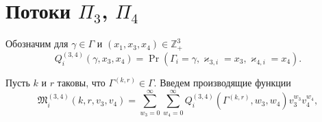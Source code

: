 \documentclass[a4paper,12pt,russian]{extarticle}
\begin{document}
\section{Потоки $\Pi_3$, $\Pi_4$}



Обозначим для $\gamma \in \Gamma$ и $(x_1,x_3,x_4) \in {\mathbb Z}_+^3$
\begin{equation}
Q^{(3,4)}_{i}(\gamma,x_3,x_4) = \Pr(\Gamma_{i}=\gamma, \varkappa_{3,i}=x_3, \varkappa_{4,i}=x_4).
\end{equation}


Пусть $k$ и $r$ таковы, что $\Gamma^{(k,r)}\in \Gamma$. Введем производящие функции
\begin{equation*}
\mathfrak{M}^{(3,4)}_i(k,r,v_3,v_4) = \sum_{w_3=0}^{\infty}\sum_{w_4=0}^{\infty} Q^{(3,4)}_{i}(\Gamma^{(k,r)},w_3,w_4) v_3^{w_3} v_4^{w_4},
\end{equation*}
\end{document}
